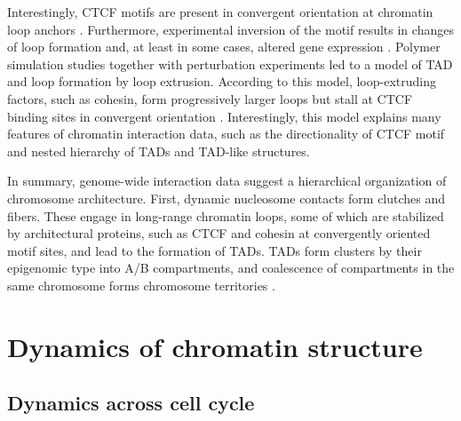 \documentclass[a4paper,twoside=true,openright,parskip=full,chapterprefix=true,11pt,headings=normal,bibliography=totoc,listof=totoc,titlepage=on,captions=tableabove,draft=false]{scrreprt}
\theoremstyle{definition}
\theoremstyle{definition}
\theoremstyle{definition}
\theoremstyle{remark}
\begin{document}
Interestingly, CTCF motifs are present in convergent orientation at
chromatin loop anchors \citep{Rao2014, Tang2015, VietriRudan2015}.
Furthermore, experimental inversion of the motif results in changes of
loop formation and, at least in some cases, altered gene expression
\citep{Guo2015, deWit2015, Sanborn2015}. Polymer simulation studies
together with perturbation experiments led to a model of TAD and loop
formation by loop extrusion. According to this model, loop-extruding
factors, such as cohesin, form progressively larger loops but stall at
CTCF binding sites in convergent orientation
\citep{Sanborn2015, Fudenberg2016}. Interestingly, this model explains
many features of chromatin interaction data, such as the directionality
of CTCF motif and nested hierarchy of TADs and TAD-like structures.

In summary, genome-wide interaction data suggest a hierarchical
organization of chromosome architecture. First, dynamic nucleosome
contacts form clutches and fibers. These engage in long-range chromatin
loops, some of which are stabilized by architectural proteins, such as
CTCF and cohesin at convergently oriented motif sites, and lead to the
formation of TADs. TADs form clusters by their epigenomic type into A/B
compartments, and coalescence of compartments in the same chromosome
forms chromosome territories \citep{Bonev2016}.

\hypertarget{dynamics-of-chromatin-structure}{%
\section{Dynamics of chromatin
structure}\label{dynamics-of-chromatin-structure}}

\hypertarget{dynamics-across-cell-cycle}{%
\subsection{Dynamics across cell
cycle}\label{dynamics-across-cell-cycle}}
\end{document}
